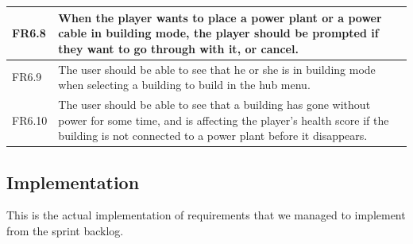 \begin{tabular}{| p{1cm} | p{8cm} | p{3cm} |}
		FR6.8 & When the player wants to place a power plant or a power cable in building mode, 
		the player should be prompted if they want to go through with it, or cancel. & \\ \hline

		FR6.9 & The user should be able to see that he or she is in building mode when selecting 
		a building to build in the hub menu. & \\ \hline

		FR6.10 & The user should be able to see that a building has gone without power for 
		some time, and is affecting the player's health score if the building is not connected 
		to a power plant before it disappears. & \\ \hline

	\end{tabular}

\subsection{Implementation}
	
	This is the actual implementation of requirements that we managed to implement
	from the sprint backlog.
	
